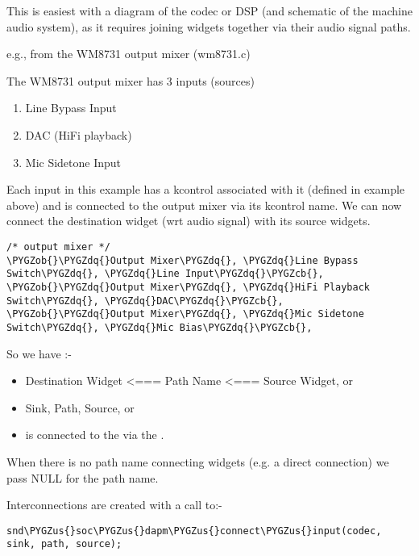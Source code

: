 \documentclass[a4paper,8pt,english]{sphinxmanual}
\def\PYGZus{\char`\_}
\def\PYGZob{\char`\{}
\def\PYGZcb{\char`\}}
\def\PYGZdq{\char`\"}
\begin{document}
This is easiest with a diagram of the codec or DSP (and schematic of the machine
audio system), as it requires joining widgets together via their audio signal
paths.

e.g., from the WM8731 output mixer (wm8731.c)

The WM8731 output mixer has 3 inputs (sources)
\begin{enumerate}
\item {} 
Line Bypass Input

\item {} 
DAC (HiFi playback)

\item {} 
Mic Sidetone Input

\end{enumerate}

Each input in this example has a kcontrol associated with it (defined in example
above) and is connected to the output mixer via its kcontrol name. We can now
connect the destination widget (wrt audio signal) with its source widgets.

\begin{Verbatim}[commandchars=\\\{\}]
/* output mixer */
\PYGZob{}\PYGZdq{}Output Mixer\PYGZdq{}, \PYGZdq{}Line Bypass Switch\PYGZdq{}, \PYGZdq{}Line Input\PYGZdq{}\PYGZcb{},
\PYGZob{}\PYGZdq{}Output Mixer\PYGZdq{}, \PYGZdq{}HiFi Playback Switch\PYGZdq{}, \PYGZdq{}DAC\PYGZdq{}\PYGZcb{},
\PYGZob{}\PYGZdq{}Output Mixer\PYGZdq{}, \PYGZdq{}Mic Sidetone Switch\PYGZdq{}, \PYGZdq{}Mic Bias\PYGZdq{}\PYGZcb{},
\end{Verbatim}

So we have :-
\begin{itemize}
\item {} 
Destination Widget  \textless{}=== Path Name \textless{}=== Source Widget, or

\item {} 
Sink, Path, Source, or

\item {} 
 is connected to the  via the .

\end{itemize}

When there is no path name connecting widgets (e.g. a direct connection) we
pass NULL for the path name.

Interconnections are created with a call to:-

\begin{Verbatim}[commandchars=\\\{\}]
snd\PYGZus{}soc\PYGZus{}dapm\PYGZus{}connect\PYGZus{}input(codec, sink, path, source);
\end{Verbatim}
\end{document}
